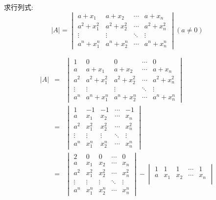 \begin{anymark}[范德蒙行列式应用]
	求行列式: 
	$$|A|=
	\begin{vmatrix}
		a+x_{1}     & a+x_{2}     & \cdots & a+x_{n}\\
		a^2+x_{1}^2 & a^2+x_{2}^2 & \cdots & a^2+x_{n}^2\\
		\vdots      & \vdots      & \ddots &\vdots\\
		a^n+x_{1}^n & a^n+x_{2}^n & \cdots & a^n+x_{n}^n
	\end{vmatrix}(a\neq 0)$$
\end{anymark}
\begin{solution}
	\begin{eqnarray*}
		|A| & = & 
		\begin{vmatrix}
			1      & 0           & 0           & \cdots & 0\\
			a      & a+x_{1}     & a+x_{2}     & \cdots & a+x_{n}\\
			a^2    & a^2+x_{1}^2 & a^2+x_{2}^2 & \cdots & a^2+x_{n}^2\\
			\vdots & \vdots      & \vdots      & \ddots & \vdots\\
			a^n    & a^n+x_{1}^n & a^n+x_{2}^n & \cdots & a^n+x_{n}^n
		\end{vmatrix} \\
		    & = & 
		\begin{vmatrix}
			1      & -1      & -1      & \cdots & -1\\
			a      & x_{1}   & x_{2}   & \cdots & x_{n}\\
			a^2    & x_{1}^2 & x_{2}^2 & \cdots & x_{n}^2\\
			\vdots & \vdots  & \vdots  & \ddots & \vdots\\
			a^n    & x_{1}^n & x_{2}^n & \cdots & x_{n}^n
		\end{vmatrix}\\
		    & = &
		\begin{vmatrix}
			2      & 0       & 0       & \cdots & 0\\
			a      & x_{1}   & x_{2}   & \cdots & x_{n}\\
			a^2    & x_{1}^2 & x_{2}^2 & \cdots & x_{n}^2\\
			\vdots & \vdots  & \vdots  & \ddots & \vdots\\
			a^n    & x_{1}^n & x_{2}^n & \cdots & x_{n}^n
		\end{vmatrix} -
		\begin{vmatrix}
			1      & 1       & 1       & \cdots & 1\\
			a      & x_{1}   & x_{2}   & \cdots & x_{n}\\

\end{vmatrix}
\end{eqnarray*}
\end{solution}
